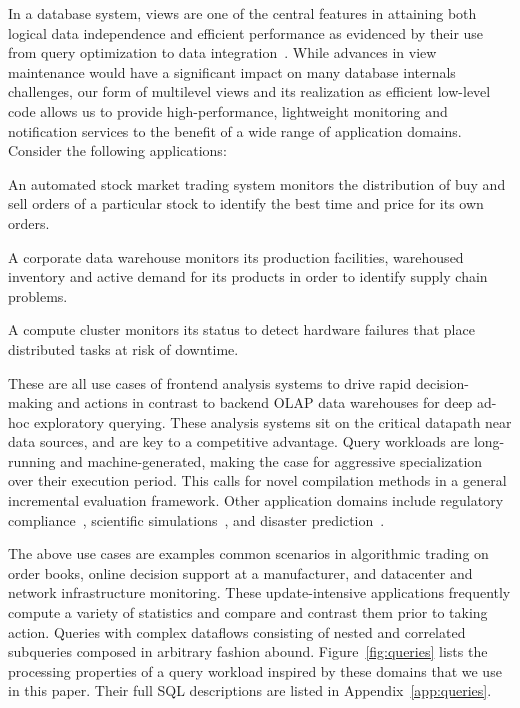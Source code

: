 In a database system, views are one of the central features in attaining both
logical data independence and efficient performance as evidenced by their use
from query optimization to data integration~\cite{halevy-vldbj01}. While
advances in view maintenance would have a significant impact on many
database internals challenges, our form of multilevel views and its realization
as efficient low-level code allows us to provide high-performance, lightweight
monitoring and notification services to the benefit of a wide range of
application domains. Consider the following applications:

\vspace{-2mm}
\begin{list}{}{ \leftmargin=1em}
\addtolength{\itemsep}{-0.5\baselineskip}
\item An automated stock market trading system monitors the distribution of buy
and sell orders of a particular stock to identify the best time and price for
its own orders.

\item A corporate data warehouse monitors its production facilities, warehoused
inventory and active demand for its products in order to identify
supply chain problems.

\item A compute cluster monitors its status to detect hardware failures
that place distributed tasks at risk of downtime.
\end{list}

\vspace{-1mm}
These are all use cases of frontend analysis systems to drive rapid
decision-making and actions in contrast to backend OLAP data warehouses for deep
ad-hoc exploratory querying. These analysis systems sit on the critical datapath
near data sources, and are key to a competitive advantage.
Query workloads are long-running and machine-generated, making the case for
aggressive specialization over their execution period. This calls for novel
compilation methods in a general incremental evaluation framework. 
Other application domains include regulatory
compliance~\cite{basel2}, scientific simulations~\cite{hey2009fourth}, and
disaster prediction~\cite{scholz1973earthquake}.


\vspace{1mm}
The above use cases are examples common scenarios in algorithmic trading on
order books, online decision support at a manufacturer, and datacenter and
network infrastructure monitoring. 
These update-intensive applications frequently compute a variety of statistics
and compare and contrast them prior to taking action. Queries with complex
dataflows consisting of nested and correlated subqueries composed in arbitrary
fashion abound.
Figure~\ref{fig:queries} lists the processing properties of a query workload
inspired by these domains that we use in this paper. Their full SQL
descriptions are listed in Appendix~\ref{app:queries}.

